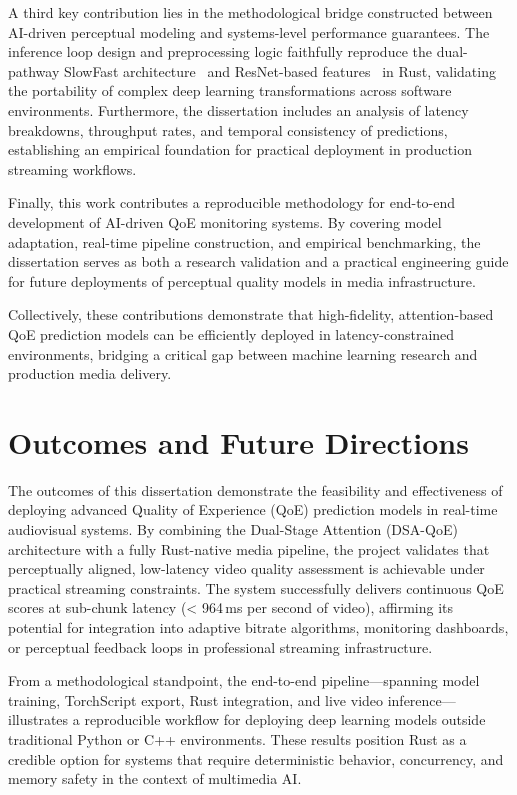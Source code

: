 A third key contribution lies in the methodological bridge constructed between AI-driven perceptual modeling and systems-level performance guarantees. The inference loop design and preprocessing logic faithfully reproduce the dual-pathway SlowFast architecture~\cite{feichtenhofer2019slowfast} and ResNet-based features~\cite{he2016deep} in Rust, validating the portability of complex deep learning transformations across software environments. Furthermore, the dissertation includes an analysis of latency breakdowns, throughput rates, and temporal consistency of predictions, establishing an empirical foundation for practical deployment in production streaming workflows.

Finally, this work contributes a reproducible methodology for end-to-end development of AI-driven QoE monitoring systems. By covering model adaptation, real-time pipeline construction, and empirical benchmarking, the dissertation serves as both a research validation and a practical engineering guide for future deployments of perceptual quality models in media infrastructure.

Collectively, these contributions demonstrate that high-fidelity, attention-based QoE prediction models can be efficiently deployed in latency-constrained environments, bridging a critical gap between machine learning research and production media delivery.

\section{Outcomes and Future Directions}

The outcomes of this dissertation demonstrate the feasibility and effectiveness of deploying advanced Quality of Experience (QoE) prediction models in real-time audiovisual systems. By combining the Dual-Stage Attention (DSA-QoE) architecture with a fully Rust-native media pipeline, the project validates that perceptually aligned, low-latency video quality assessment is achievable under practical streaming constraints. The system successfully delivers continuous QoE scores at sub-chunk latency (< 964\,ms per second of video), affirming its potential for integration into adaptive bitrate algorithms, monitoring dashboards, or perceptual feedback loops in professional streaming infrastructure.

From a methodological standpoint, the end-to-end pipeline—spanning model training, TorchScript export, Rust integration, and live video inference—illustrates a reproducible workflow for deploying deep learning models outside traditional Python or C++ environments. These results position Rust as a credible option for systems that require deterministic behavior, concurrency, and memory safety in the context of multimedia AI.

